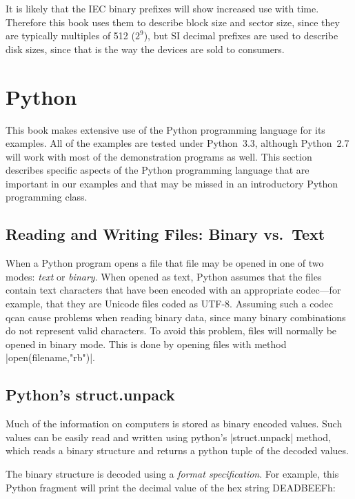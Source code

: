 It is likely that the IEC binary prefixes will show increased use
with time. Therefore this book uses them to describe block size and
sector size, since they are typically multiples of 512 ($2^9$), but 
SI decimal prefixes are used to describe disk sizes, since that is the way
the devices are sold to consumers.


\section{Python}
This book makes extensive use of the Python programming language for
its examples. All of the examples are tested under Python~3.3,
although Python~2.7 will work with most of the demonstration programs
as well.  This section describes specific aspects of the Python
programming language that are important in our examples and that may
be missed in an introductory Python programming class.

\subsection{Reading and Writing Files: Binary vs.\ Text}

When a Python program opens a file that file may be opened in one of
two modes: \emph{text} or \emph{binary}.  When opened as text, Python
assumes that the files contain text characters that have been encoded
with an appropriate codec---for example, that they are Unicode files
coded as UTF-8. Assuming such a codec qcan cause problems when reading
binary data, since many binary combinations do not represent valid
characters. To avoid this problem, files will normally be opened in
binary mode. This is done by opening files with method
|open(filename,"rb")|.

\subsection{Python's struct.unpack}
Much of the information on computers is stored as binary encoded
values. Such values can be easily read and written using python's
|struct.unpack| method, which reads a binary structure and returns a
python tuple of the decoded values.  

The binary structure is decoded using a \emph{format
  specification}. For example, this Python fragment will print the
decimal value of the hex string DEADBEEFh:




